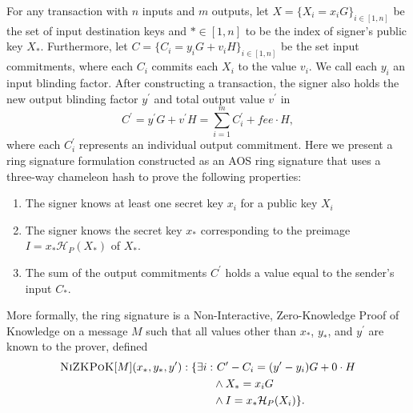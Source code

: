 \documentclass{article}
\newcommand{\algoname}[1]{\textnormal{\textsc{#1}}}
\newcommand{\nizkpok}{\algoname{NiZKPoK}}
\newcommand{\sidx}{\ensuremath{*}}
\newcommand{\pkset}{\ensuremath{X}}
\newcommand{\ix}{\ensuremath{x_i}}
\newcommand{\sx}{\ensuremath{x_\sidx}}
\newcommand{\ipk}{\ensuremath{X_i}}
\newcommand{\spk}{\ensuremath{X_\sidx}}
\newcommand{\iy}{\ensuremath{y_i}}
\newcommand{\sy}{\ensuremath{y_\sidx}}
\newcommand{\oy}{\ensuremath{y^\prime}}
\newcommand{\iC}{\ensuremath{C_i}}
\newcommand{\sC}{\ensuremath{C_\sidx}}
\newcommand{\oC}{\ensuremath{C^\prime}}
\newcommand{\oiC}{\ensuremath{C^\prime_i}}
\newcommand{\iv}{\ensuremath{v_i}}
\newcommand{\ov}{\ensuremath{v^\prime}}
\newcommand{\hp}{\ensuremath{\mathcal{H}_P}}
\begin{document}
For any transaction with $n$ inputs and $m$ outputs, let $\pkset = \{ \ipk = \ix
G\}_{i \in [1,n]}$ be the set of input destination keys and $\sidx \in [1,n]$ to
be the index of signer's public key {\spk}.  Furthermore, let $C = \{ {\iC} =
{\iy} G + \iv H \}_{i \in [1,n]}$ be the set input commitments, where each $\iC$
commits each {\ipk} to the value {\iv}.  We call each {\iy} an input blinding
factor.  After constructing a transaction, the signer also holds the new output
blinding factor {\oy} and total output value {\ov} in
\[ \oC = \oy G + \ov H = \sum_{i=1}^{m} \oiC + fee \cdot H, \]
where each $\oiC$ represents an individual output commitment.  Here we present
a ring signature formulation constructed as an AOS ring signature \cite{AOS02}
that uses a three-way chameleon hash to prove the following properties:
\begin{enumerate}
  \item The signer knows at least one secret key {\ix} for a public key {\ipk}

  \item The signer knows the secret key {\sx} corresponding to the preimage $I =
  {\sx} \hp({\spk})$ of {\spk}.

  \item The sum of the output commitments {\oC} holds a value equal to the
  sender's input {\sC}.
\end{enumerate}
More formally, the ring signature is a Non-Interactive, Zero-Knowledge Proof of
Knowledge on a message $M$ such that all values other than {\sx}, {\sy}, and
{\oy} are known to the prover, defined 
\begin{align*}
\nizkpok[M](\sx, \sy, \oy) : \{ \exists i : 
& ~ \oC - \iC = (\oy - \iy)G + 0 \cdot H\\
& \land \spk = \ix G \\
& \land I = \sx \hp(\ipk)\}.
\end{align*}
\end{document}
